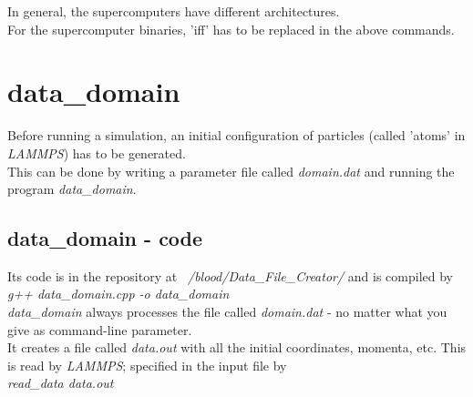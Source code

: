 \documentclass[a4paper,10pt]{scrreprt}
\begin{document}
In general, the supercomputers have different architectures.\\For the supercomputer binaries, 'iff' has to be replaced in the above commands.

\section{data\_domain}
\label{sec:data_domain}
Before running a simulation, an initial configuration of particles (called 'atoms' in \textit{LAMMPS}) has to be generated.\\This can be done by writing a parameter file called \textit{domain.dat} and running the program \textit{data\_domain}.
\subsection{data\_domain - code}
Its code is in the repository at \textit{~/blood/Data\_File\_Creator/} and is compiled by\\ \textit{g++ data\_domain.cpp -o data\_domain}\\\textit{data\_domain} always processes the file called \textit{domain.dat} - no matter what you give as command-line parameter.\\It creates a file called \textit{data.out} with all the initial coordinates, momenta, etc. This is read by \textit{LAMMPS}; specified in the input file by\\ \textit{read\_data data.out}
\end{document}
